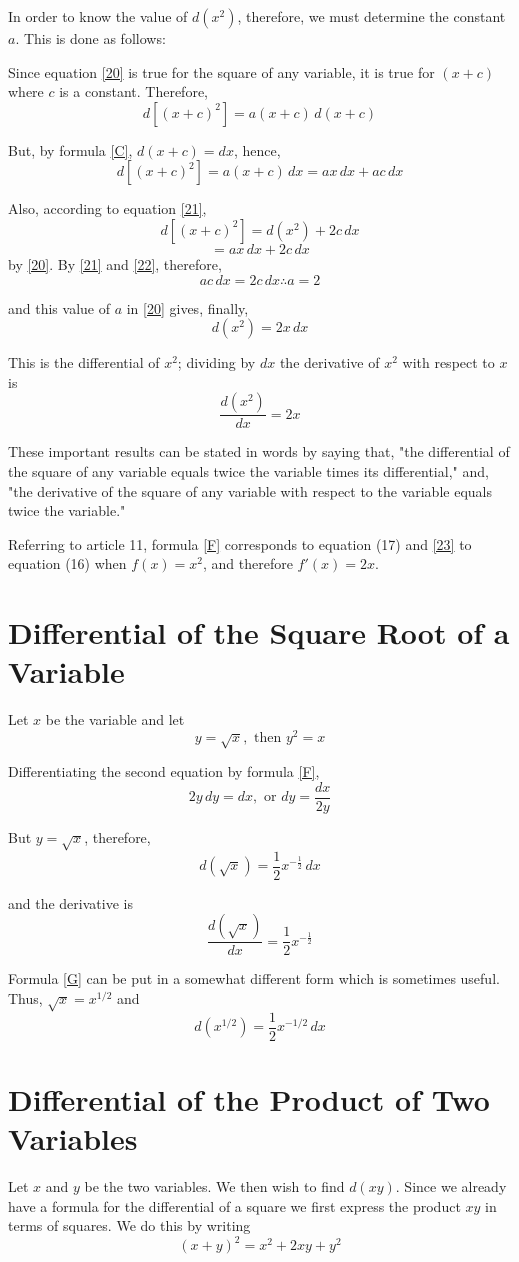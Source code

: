 In order to know the value of $d(x^2)$, therefore, we must determine the constant $a$. This is done as follows:

Since equation \eqref{20} is true for the square of any variable, it is true for $(x + c)$ where $c$ is a constant. Therefore,
\[d[(x+c)^2] = a(x+c)\,d(x+c)\]

But, by formula \eqref{C}, $d(x+c) = dx$, hence,
\[d[(x+c)^2] = a(x+c)\,dx = ax\,dx + ac\,dx\]

Also, according to equation \eqref{21},
\[d[(x+c)^2] = d(x^2) + 2c\,dx \tag{21} \label{21}\]
\[= ax\,dx + 2c\,dx \tag{22} \label{22}\]
by \eqref{20}. By \eqref{21} and \eqref{22}, therefore,
\[ac\,dx = 2c\,dx \therefore a = 2\]

and this value of $a$ in \eqref{20} gives, finally,
\[d(x^2) = 2x\,dx \tag{F} \label{F}\]

This is the differential of $x^2$; dividing by $dx$ the derivative of $x^2$ with respect to $x$ is
\[\frac{d(x^2)}{dx} = 2x \tag{23} \label{23}\]

These important results can be stated in words by saying that, "the differential of the square of any variable equals twice the variable times its differential," and, "the derivative of the square of any variable with respect to the variable equals twice the variable."

Referring to article 11, formula \eqref{F} corresponds to equation (17) and \eqref{23} to equation (16) when $f(x) = x^2$, and therefore $f'(x) = 2x$.

\section{Differential of the Square Root of a Variable}
Let $x$ be the variable and let
\[y = \sqrt{x}, \text{ then } y^2 = x\]

Differentiating the second equation by formula \eqref{F},
\[2y\,dy = dx, \text{ or } dy = \frac{dx}{2y}\]

But $y = \sqrt{x}$, therefore,
\[d(\sqrt{x}) = \frac{1}{2}x^{-\frac{1}{2}}\,dx \tag{G} \label{G}\]

and the derivative is
\[\frac{d(\sqrt{x})}{dx} = \frac{1}{2}x^{-\frac{1}{2}} \tag{24} \label{24}\]

Formula \eqref{G} can be put in a somewhat different form which is sometimes useful. Thus, $\sqrt{x} = x^{1/2}$ and
\[d(x^{1/2}) = \frac{1}{2}x^{-1/2}\,dx \tag{25} \label{25}\]

\section{Differential of the Product of Two Variables}
Let $x$ and $y$ be the two variables. We then wish to find $d(xy)$. Since we already have a formula for the differential of a square we first express the product $xy$ in terms of squares. We do this by writing
\[(x+y)^2 = x^2 + 2xy + y^2\]

